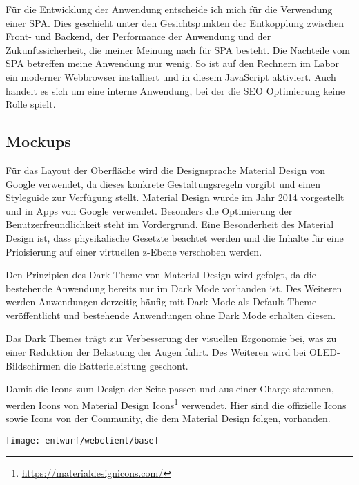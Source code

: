 Für die Entwicklung der Anwendung entscheide ich mich für die Verwendung einer SPA. Dies geschieht unter den Gesichtspunkten der Entkopplung zwischen Front- und Backend, der Performance der Anwendung und der Zukunftssicherheit, die meiner Meinung nach für SPA besteht. Die Nachteile vom SPA betreffen meine Anwendung nur wenig. So ist auf den Rechnern im Labor ein moderner Webbrowser installiert und in diesem JavaScript aktiviert. Auch handelt es sich um eine interne Anwendung, bei der die SEO Optimierung keine Rolle spielt. \cite{melnikSinglePageApplication2020}

\subsection{Mockups} \label{subsec:Mockup}

Für das Layout der Oberfläche wird die Designsprache Material Design von Google verwendet, da dieses konkrete Gestaltungsregeln vorgibt und einen Styleguide zur Verfügung stellt. Material Design wurde im Jahr 2014 vorgestellt und in Apps von Google verwendet. Besonders die Optimierung der Benutzerfreundlichkeit steht im Vordergrund. Eine Besonderheit des Material Design ist, dass physikalische Gesetzte beachtet werden und die Inhalte für eine Prioisierung auf einer virtuellen z-Ebene verschoben werden. \cite{kulturbanause-teamMaterialDesignDesignsprache2017}

Den Prinzipien des Dark Theme von Material Design wird gefolgt, da die bestehende Anwendung bereits nur im Dark Mode vorhanden ist. Des Weiteren werden Anwendungen derzeitig häufig mit Dark Mode als Default Theme veröffentlicht und bestehende Anwendungen ohne Dark Mode erhalten diesen. \cite{colbyWindows10Dark2020}

Das Dark Themes trägt zur Verbesserung der visuellen Ergonomie bei, was zu einer Reduktion der Belastung der Augen führt. Des Weiteren wird bei OLED-Bildschirmen die Batterieleistung geschont. \cite{googleDarkTheme}

Damit die Icons zum Design der Seite passen und aus einer Charge stammen, werden Icons von Material Design Icons\footnote{\url{https://materialdesignicons.com/}} verwendet. Hier sind die offizielle Icons sowie Icons von der Community, die dem Material Design folgen, vorhanden.

\begin{center}
	\texttt{[image: entwurf/webclient/base]}
	\label{fig:mockup-base}
\end{center}

